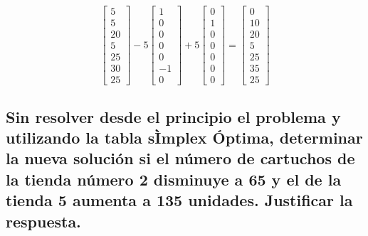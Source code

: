 \documentclass[10pt, a4paper]{article}
\begin{document}
			\[
			\begin{bmatrix}
			    5 \\
			    5 \\
				20 \\
				5 \\
				25 \\
				30 \\
				25
			\end{bmatrix}
			-5
			\begin{bmatrix}
			    1 \\
			    0 \\
				0 \\
				0 \\
				0 \\
				-1 \\
				0
			\end{bmatrix}
			+5
			\begin{bmatrix}
			    0 \\
			    1 \\
				0 \\
				0 \\
				0 \\
				0 \\
				0
			\end{bmatrix}
			=
			\begin{bmatrix}
			    0 \\
			    10 \\
				20 \\
				5 \\
				25 \\
				35 \\
				25
			\end{bmatrix}
			\]


		\subsection{Sin resolver desde el principio el problema y utilizando la tabla sÌmplex Óptima, determinar la nueva solución si el número de cartuchos de la tienda número 2 disminuye a 65 y el de la tienda 5 aumenta a 135 unidades. Justificar la respuesta.}

			\paragraph{}
\end{document}
